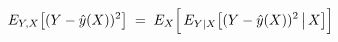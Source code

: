 \documentclass[preview]{standalone}
\begin{document}
\begin{align*}
\special{dvisvgm:raw <g id='unique000'>}E_{Y,X}\big[(Y-\hat{y}(X))^2\big] \;=\;E_X\Big[\,E_{Y|X}\big[(Y-\hat{y}(X))^2\,\big|\,X\big]\Big]\special{dvisvgm:raw </g>}
\end{align*}
\end{document}
